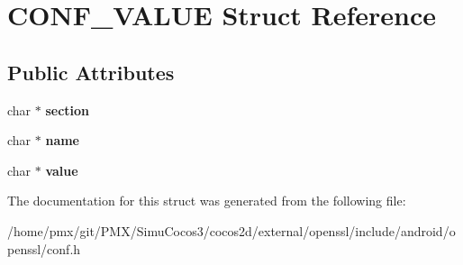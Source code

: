 \hypertarget{structCONF__VALUE}{}\section{C\+O\+N\+F\+\_\+\+V\+A\+L\+UE Struct Reference}
\label{structCONF__VALUE}
\subsection*{Public Attributes}
\begin{DoxyCompactItemize}
\item 
\mbox{\label{structCONF__VALUE_a2f1a59d5408eecf8fce41eb2ebfa977f}} 
char $\ast$ {\bfseries section}
\item 
\mbox{\label{structCONF__VALUE_a82c0f66dae74a44030a32f9cd3091d54}} 
char $\ast$ {\bfseries name}
\item 
\mbox{\label{structCONF__VALUE_a941c6684fc43ba32fdb359a12fc42d00}} 
char $\ast$ {\bfseries value}
\end{DoxyCompactItemize}


The documentation for this struct was generated from the following file\+:\begin{DoxyCompactItemize}
\item 
/home/pmx/git/\+P\+M\+X/\+Simu\+Cocos3/cocos2d/external/openssl/include/android/openssl/conf.\+h\end{DoxyCompactItemize}
